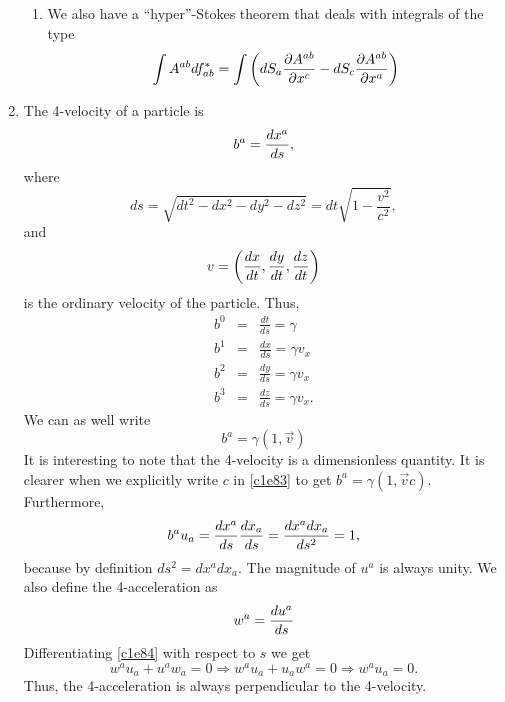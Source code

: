 \begin{enumerate}
\begin{enumerate}
\item We also have a ``hyper''-Stokes theorem that deals with integrals of the 
type
\begin{equation}\label{c1e77}
\int A^{ab}df^\ast_{ab} = 
\int\left(dS_a\frac{\partial{A^{ab}}}{\partial{x^c}} - dS_c\frac{\partial{A^{ab}}}{\partial{x^a}}\right)
\end{equation}
\end{enumerate}

\item The 4-velocity of a particle is
\begin{equation}\label{c1e78}b^a = \frac{d{x^a}}{d{s}},
\end{equation}
where
\[
ds = \sqrt{dt^2 - dx^2 - dy^2 - dz^2} = dt\sqrt{1 - \frac{v^2}{c^2}},
\]
and
\[
v = \left(\frac{d{x}}{d{t}}, \frac{d{y}}{d{t}}, \frac{d{z}}{d{t}}\right)
\]
is the ordinary velocity of the particle. Thus,
\begin{eqnarray}
b^0&=&\frac{dt}{ds} = \gamma \label{c1e79}\\
b^1&=&\frac{dx}{ds} = \gamma v_x \label{c1e80} \\
b^2&=&\frac{dy}{ds} = \gamma v_x \label{c1e81} \\
b^3&=&\frac{dz}{ds} = \gamma v_x. \label{c1e82}
\end{eqnarray}
We can as well write
\begin{equation}\label{c1e83}
b^a = \gamma(1, \vec{v}) 
\end{equation}
It is interesting to note that the 4-velocity is a dimensionless quantity. It
is clearer when we explicitly write $c$ in \eqref{c1e83} to get $b^a = \gamma(
1, \vec{v}{c})$. Furthermore,
\begin{equation}\label{c1e84}
b^a u_a = \frac{d{x^a}}{d{s}}\frac{d{x_a}}{d{s}} = \frac{dx^a dx_a}{ds^2} = 1,
\end{equation}
because by definition $ds^2 = dx^a dx_a$. The magnitude of $u^a$ is always
unity. We also define the 4-acceleration as
\begin{equation}\label{c1e85}
w^a = \frac{d{u^a}}{d{s}}
\end{equation}
Differentiating \eqref{c1e84} with respect to $s$ we get
\begin{equation}\label{c1e86}
w^a u_a + u^a w_a = 0 \Rightarrow w^a u_a + u_a w^a = 0 \Rightarrow w^a u_a = 0.
\end{equation}
Thus, the 4-acceleration is always perpendicular to the 4-velocity.
\end{enumerate}

